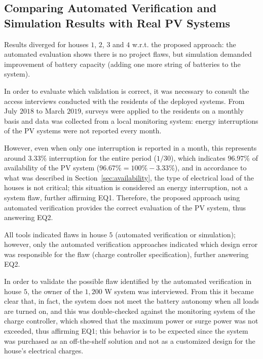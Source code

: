 \subsection{Comparing Automated Verification and Simulation Results with Real PV Systems}

Results diverged for houses $1$, $2$, $3$ and $4$ w.r.t. the proposed approach: the automated evaluation shows there is no project flaws, but simulation demanded improvement of battery capacity (adding one more string of batteries to the system). 

In order to evaluate which validation is correct, it was necessary to consult the access interviews conducted with the residents of the deployed systems. From July $2018$ to March $2019$, surveys were applied to the residents on a monthly basis and data was collected from a local monitoring system: energy interruptions of the PV systems were not reported every month. 

However, even when only one interruption is reported in a month, this represents around $3.33$\% interruption for the entire period ($1/30$), which indicates $96.97$\% of availability of the PV system ($96.67\% = 100\%-3.33\%$), and in accordance to what was described in Section~\ref{sec:availability}, the type of electrical load of the houses is not critical; this situation is considered an energy interruption, not a system flaw, further affirming EQ1. Therefore, the proposed approach using automated verification provides the correct evaluation of the PV system, thus answering EQ2.

All tools indicated flaws in house $5$ (automated verification or simulation); however, only the automated verification approaches indicated which design error was responsible for the flaw (charge controller specification), further answering EQ2.

In order to validate the possible flaw identified by the automated verification in house $5$, the owner of the $1,200$ W system was interviewed. From this it became clear that, in fact, the system does not meet the battery autonomy when all loads are turned on, and this was double-checked against the monitoring system of the charge controller, which showed that the maximum power or surge power was not exceeded, thus affirming EQ1; this behavior is to be expected since the system was purchased as an off-the-shelf solution and not as a customized design for the house's electrical charges. 

%
